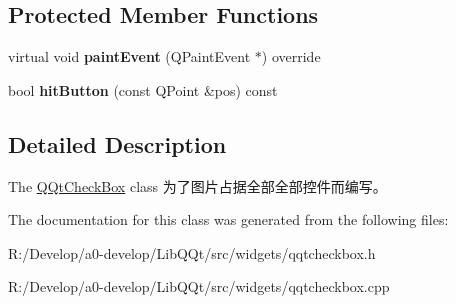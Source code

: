 \subsection*{Protected Member Functions}
\begin{DoxyCompactItemize}
\item 
\mbox{\label{class_q_qt_check_box_a431b88223a1504574da023ad95298716}} 
virtual void {\bfseries paint\+Event} (Q\+Paint\+Event $\ast$) override
\item 
\mbox{\label{class_q_qt_check_box_aa59d39b6f73a35058380b45433bd3cc3}} 
bool {\bfseries hit\+Button} (const Q\+Point \&pos) const
\end{DoxyCompactItemize}


\subsection{Detailed Description}
The \mbox{\hyperlink{class_q_qt_check_box}{Q\+Qt\+Check\+Box}} class 为了图片占据全部全部控件而编写。 

The documentation for this class was generated from the following files\+:\begin{DoxyCompactItemize}
\item 
R\+:/\+Develop/a0-\/develop/\+Lib\+Q\+Qt/src/widgets/qqtcheckbox.\+h\item 
R\+:/\+Develop/a0-\/develop/\+Lib\+Q\+Qt/src/widgets/qqtcheckbox.\+cpp\end{DoxyCompactItemize}
